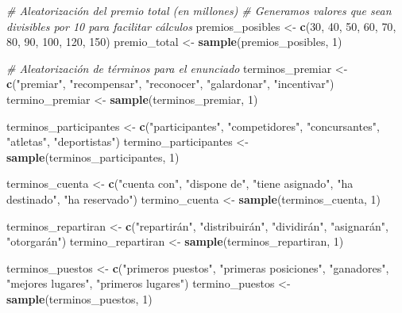 \documentclass[
]{article}
\newenvironment{Shaded}{\begin{snugshade}}{\end{snugshade}}
\newcommand{\CommentTok}[1]{\textcolor[rgb]{0.56,0.35,0.01}{\textit{#1}}}
\newcommand{\DecValTok}[1]{\textcolor[rgb]{0.00,0.00,0.81}{#1}}
\newcommand{\FunctionTok}[1]{\textcolor[rgb]{0.13,0.29,0.53}{\textbf{#1}}}
\newcommand{\NormalTok}[1]{#1}
\newcommand{\OtherTok}[1]{\textcolor[rgb]{0.56,0.35,0.01}{#1}}
\newcommand{\StringTok}[1]{\textcolor[rgb]{0.31,0.60,0.02}{#1}}
\begin{document}
\begin{Shaded}
\begin{Highlighting}[]
\CommentTok{\# Aleatorización del premio total (en millones)}
\CommentTok{\# Generamos valores que sean divisibles por 10 para facilitar cálculos}
\NormalTok{premios\_posibles }\OtherTok{\textless{}{-}} \FunctionTok{c}\NormalTok{(}\DecValTok{30}\NormalTok{, }\DecValTok{40}\NormalTok{, }\DecValTok{50}\NormalTok{, }\DecValTok{60}\NormalTok{, }\DecValTok{70}\NormalTok{, }\DecValTok{80}\NormalTok{, }\DecValTok{90}\NormalTok{, }\DecValTok{100}\NormalTok{, }\DecValTok{120}\NormalTok{, }\DecValTok{150}\NormalTok{)}
\NormalTok{premio\_total }\OtherTok{\textless{}{-}} \FunctionTok{sample}\NormalTok{(premios\_posibles, }\DecValTok{1}\NormalTok{)}

\CommentTok{\# Aleatorización de términos para el enunciado}
\NormalTok{terminos\_premiar }\OtherTok{\textless{}{-}} \FunctionTok{c}\NormalTok{(}\StringTok{"premiar"}\NormalTok{, }\StringTok{"recompensar"}\NormalTok{, }\StringTok{"reconocer"}\NormalTok{, }\StringTok{"galardonar"}\NormalTok{, }\StringTok{"incentivar"}\NormalTok{)}
\NormalTok{termino\_premiar }\OtherTok{\textless{}{-}} \FunctionTok{sample}\NormalTok{(terminos\_premiar, }\DecValTok{1}\NormalTok{)}

\NormalTok{terminos\_participantes }\OtherTok{\textless{}{-}} \FunctionTok{c}\NormalTok{(}\StringTok{"participantes"}\NormalTok{, }\StringTok{"competidores"}\NormalTok{, }\StringTok{"concursantes"}\NormalTok{, }\StringTok{"atletas"}\NormalTok{, }\StringTok{"deportistas"}\NormalTok{)}
\NormalTok{termino\_participantes }\OtherTok{\textless{}{-}} \FunctionTok{sample}\NormalTok{(terminos\_participantes, }\DecValTok{1}\NormalTok{)}

\NormalTok{terminos\_cuenta }\OtherTok{\textless{}{-}} \FunctionTok{c}\NormalTok{(}\StringTok{"cuenta con"}\NormalTok{, }\StringTok{"dispone de"}\NormalTok{, }\StringTok{"tiene asignado"}\NormalTok{, }\StringTok{"ha destinado"}\NormalTok{, }\StringTok{"ha reservado"}\NormalTok{)}
\NormalTok{termino\_cuenta }\OtherTok{\textless{}{-}} \FunctionTok{sample}\NormalTok{(terminos\_cuenta, }\DecValTok{1}\NormalTok{)}

\NormalTok{terminos\_repartiran }\OtherTok{\textless{}{-}} \FunctionTok{c}\NormalTok{(}\StringTok{"repartirán"}\NormalTok{, }\StringTok{"distribuirán"}\NormalTok{, }\StringTok{"dividirán"}\NormalTok{, }\StringTok{"asignarán"}\NormalTok{, }\StringTok{"otorgarán"}\NormalTok{)}
\NormalTok{termino\_repartiran }\OtherTok{\textless{}{-}} \FunctionTok{sample}\NormalTok{(terminos\_repartiran, }\DecValTok{1}\NormalTok{)}

\NormalTok{terminos\_puestos }\OtherTok{\textless{}{-}} \FunctionTok{c}\NormalTok{(}\StringTok{"primeros puestos"}\NormalTok{, }\StringTok{"primeras posiciones"}\NormalTok{, }\StringTok{"ganadores"}\NormalTok{, }\StringTok{"mejores lugares"}\NormalTok{, }\StringTok{"primeros lugares"}\NormalTok{)}
\NormalTok{termino\_puestos }\OtherTok{\textless{}{-}} \FunctionTok{sample}\NormalTok{(terminos\_puestos, }\DecValTok{1}\NormalTok{)}


\end{Highlighting}
\end{Shaded}
\end{document}
